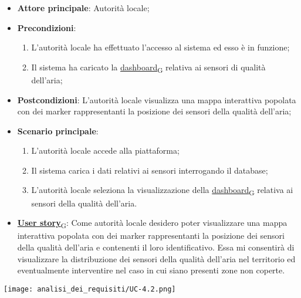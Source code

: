 \begin{itemize}
	\item \textbf{Attore principale}: Autorità locale;
	\item \textbf{Precondizioni}:
	      \begin{enumerate}
		      \item L'autorità locale ha effettuato l'accesso al sistema ed esso è in funzione;
		      \item Il sistema ha caricato la \href{https://7last.github.io/docs/rtb/documentazione-interna/glossario\#dashboard}{dashboard\textsubscript{G}} relativa ai sensori di qualità dell'aria;
	      \end{enumerate}
	\item \textbf{Postcondizioni}: L'autorità locale visualizza una mappa interattiva popolata con dei marker rappresentanti la posizione dei sensori della qualità dell'aria;
	\item \textbf{Scenario principale}:
	      \begin{enumerate}
		      \item L'autorità locale accede alla piattaforma;
		      \item Il sistema carica i dati relativi ai sensori interrogando il database;
		      \item L'autorità locale seleziona la visualizzazione della \href{https://7last.github.io/docs/rtb/documentazione-interna/glossario\#dashboard}{dashboard\textsubscript{G}} relativa ai sensori della qualità dell'aria.
	      \end{enumerate}
	\item \href{https://7last.github.io/docs/rtb/documentazione-interna/glossario\#user-story}{\textbf{User story}\textsubscript{G}}:
	      Come autorità locale desidero poter visualizzare una mappa interattiva popolata con dei marker rappresentanti la posizione dei sensori della qualità dell'aria
	      e contenenti il loro identificativo. Essa mi consentirà di visualizzare la distribuzione dei sensori della qualità dell'aria nel territorio ed eventualmente interventire nel caso in cui siano presenti zone non coperte.
\end{itemize}
\begin{center}
	\texttt{[image: analisi\_dei\_requisiti/UC-4.2.png]}
\end{center}

